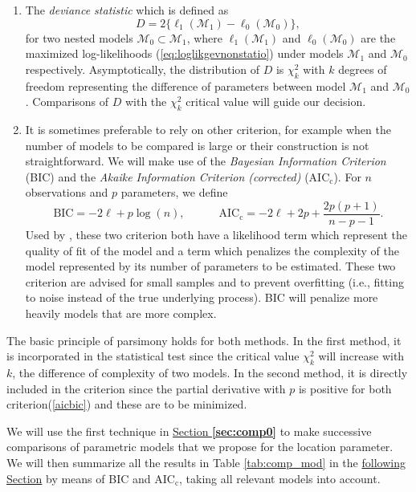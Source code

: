 \begin{enumerate}
	\item The \emph{deviance statistic} which is defined as 
	\begin{equation}
	D = 2\big\{\ell_1(\mathcal{M}_1)-\ell_0(\mathcal{M}_0)\big\},
	\end{equation}
	for two nested models $\mathcal{M}_0\subset \mathcal{M}_1$, where $\ell_1(\mathcal{M}_1)$ and $\ell_0(\mathcal{M}_0)$ are the maximized log-likelihoods (\ref{eq:loglikgevnonstatio}) under models $\mathcal{M}_1$ and $\mathcal{M}_0$ respectively.
	Asymptotically, the distribution of $D$ is $\chi^2_k$ with $k$ degrees of freedom representing the difference of parameters between model $\mathcal{M}_1$ and $\mathcal{M}_0$. Comparisons of $D$ with the $\chi^2_k$ critical value will guide our decision.  
	
	\item\label{aicbic} It is sometimes preferable to rely on other criterion, for example when the number of models to be compared is large or their construction is not straightforward. We will make use of the \emph{Bayesian Information Criterion} (BIC) and  the \emph{Akaike Information Criterion (corrected) } ($\text{AIC}_{\text{c}}$). For $n$ observations and $p$ parameters, 
we define 
	\begin{equation}\label{aicbic}
\text{BIC} = -2\ell+ p\log(n), \qquad\quad \text{AIC}_{\text{c}}=-2\ell+2p+\frac{2p(p+1)}{n-p-1}.
	\end{equation}
	 Used by \citet{cannon_flexible_2010}, these two criterion both have a likelihood term which represent the quality of fit of the model and a term which penalizes the complexity of the model represented by its number of parameters to be estimated. These two criterion are advised for small samples and to prevent overfitting (i.e., fitting to noise instead of the true underlying process). BIC will penalize more heavily models that are more complex.
\end{enumerate}
The basic principle of parsimony holds for both methods. In the first method, it is incorporated in the statistical test since the critical value $\chi^2_k$ will increase with $k$, the difference of complexity of two models. In the second method, it is directly included in the criterion since the partial derivative with $p$ is positive for both criterion(\ref{aicbic}) and these are to be minimized. %

We will use the first technique in \hyperref[sec:comp0]{Section \textbf{\ref{sec:comp0}}} to make successive comparisons of parametric models that we propose for the location parameter. We will then summarize all the results in Table \ref{tab:comp_mod} in the \hyperref[sec:nnxp]{following Section} by means of BIC and $\text{AIC}_{\text{c}}$, taking all relevant models into account.


